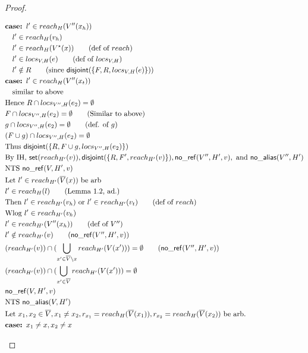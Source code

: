 \documentclass[11pt]{article}
\newcommand{\ms}[1]{\ensuremath{\mathsf{#1}}}
\newcommand{\na}[1]{\mathsf{no\_alias}(#1)}
\newcommand{\nr}[1]{\mathsf{no\_ref}(#1)}
\newcommand{\dist}[1]{\mathsf{disjoint}(#1)}
\begin{document}
\begin{proof}
\begin{description}
\begin{align*}
  &\textbf{case: }  l' \in reach_{H}(V''(x_h)) \\
  &\quad l' \in reach_{H}(v_h)\\
  &\quad l' \in reach_{H}(V^{\star}(x)) \tag{def of $reach$}\\
  &\quad l' \in locs_{V,H}(e) \tag{def of $locs_{V,H}$}\\
  &\quad l' \notin R \tag{since $\dist{\{F,R,locs_{V,H}(e)\}}$}\\
  &\textbf{case: }  l' \in reach_{H}(V''(x_t)) \\
  &\quad \text{similar to above}\\
  &\text{Hence } R \cap locs_{V'',H}(e_2) = \emptyset\\
  &F \cap locs_{V'',H}(e_2) = \emptyset \tag{Similar to above}\\
  &g \cap locs_{V'',H}(e_2) = \emptyset \tag{def. of $g$}\\
  &(F \cup g) \cap locs_{V'',H}(e_2) = \emptyset\\
  &\text{Thus } \dist{\{R,F \cup g,locs_{V'',H}(e_2)\}}\\
  &\text{By IH, } \ms{set}(reach_{H'}(v)), \dist{\{R,F',reach_{H'}(v)\}}, \nr{V'',H',v}, \text{ and } \na{V'',H'}\\
  &\text{NTS } \nr{V,H',v}\\
  &\text{Let } l' \in reach_{H'}(\overline V(x)) \text{ be arb }\\
  &l' \in reach_H(l) \tag{Lemma 1.2, ad.}\\
  &\text{Then } l' \in reach_{H'}(v_h) \text{ or } l' \in reach_{H'}(v_t) \tag{def of $reach$}\\
  &\text{Wlog } l' \in reach_{H'}(v_h)\\
  &l' \in reach_{H'}(V''(x_h)) \tag{def of $V''$}\\
  &l' \notin reach_{H'}(v) \tag{$\nr{V'',H',v}$}\\
  &(reach_{H'}(v)) \cap (\bigcup_{x' \in \overline V \setminus x} reach_{H'}(V(x'))) = \emptyset \tag{$\nr{V'',H',v}$}\\
  &(reach_{H'}(v)) \cap (\bigcup_{x' \in \overline V} reach_{H'}(V(x'))) = \emptyset\\
  &\nr{V,H',v}\\
  &\text{NTS } \na{V,H'}\\
  &\text{Let } x_1, x_2 \in \overline V, x_1 \ne x_2, r_{x_1} = reach_H(\overline V(x_1)), r_{x_2} = reach_H(\overline V(x_2)) \text{ be arb.}\\
  &\textbf{case: } x_1 \ne x, x_2 \ne x\\

\end{align*}
\end{description}
\end{proof}
\end{document}
